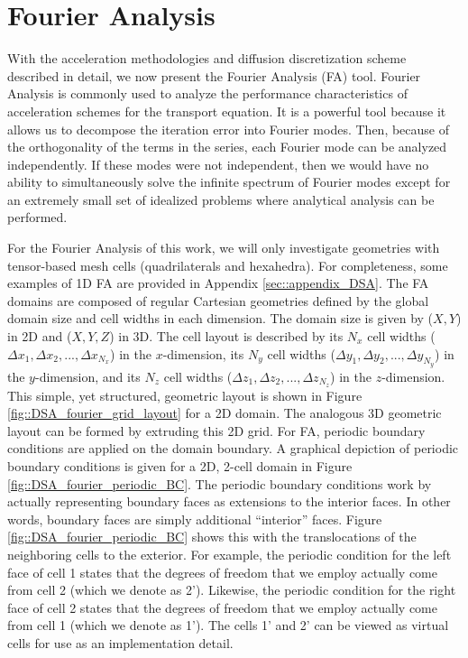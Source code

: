 \section{Fourier Analysis}
\label{sec::DSA_Fourier}

With the acceleration methodologies and diffusion discretization scheme described in detail, we now present the Fourier Analysis (FA) tool. Fourier Analysis is commonly used to analyze the performance characteristics of acceleration schemes for the transport equation. It is a powerful tool because it allows us to decompose the iteration error into Fourier modes. Then, because of the orthogonality of the terms in the series, each Fourier mode can be analyzed independently. If these modes were not independent, then we would have no ability to simultaneously solve the infinite spectrum of Fourier modes except for an extremely small set of idealized problems where analytical analysis can be performed.

For the Fourier Analysis of this work, we will only investigate geometries with tensor-based mesh cells (quadrilaterals and hexahedra). For completeness, some examples of 1D FA are provided in Appendix \ref{sec::appendix_DSA}. The FA domains are composed of regular Cartesian geometries defined by the global domain size and cell widths in each dimension. The domain size is given by ($X,Y$) in 2D and ($X,Y,Z$) in 3D. The cell layout is described by its $N_x$ cell widths ($\Delta x_{1}, \Delta x_{2}, ..., \Delta x_{N_x}$) in the $x$-dimension, its $N_y$ cell widths ($\Delta y_{1}, \Delta y_{2}, ..., \Delta y_{N_y}$) in the $y$-dimension, and its $N_z$ cell widths ($\Delta z_{1}, \Delta z_{2}, ..., \Delta z_{N_z}$) in the $z$-dimension. This simple, yet structured, geometric layout is shown in Figure \ref{fig::DSA_fourier_grid_layout} for a 2D domain. The analogous 3D geometric layout can be formed by extruding this 2D grid. For FA, periodic boundary conditions are applied on the domain boundary. A graphical depiction of periodic boundary conditions is given for a 2D, 2-cell domain in Figure \ref{fig::DSA_fourier_periodic_BC}. The periodic boundary conditions work by actually representing boundary faces as extensions to the interior faces. In other words, boundary faces are simply additional ``interior'' faces. Figure \ref{fig::DSA_fourier_periodic_BC} shows this with the translocations of the neighboring cells to the exterior. For example, the periodic condition for the left face of cell 1 states that the degrees of freedom that we employ actually come from cell 2 (which we denote as 2'). Likewise, the periodic condition for the right face of cell 2 states that the degrees of freedom that we employ actually come from cell 1 (which we denote as 1'). The cells 1' and 2' can be viewed as virtual cells for use as an implementation detail.

